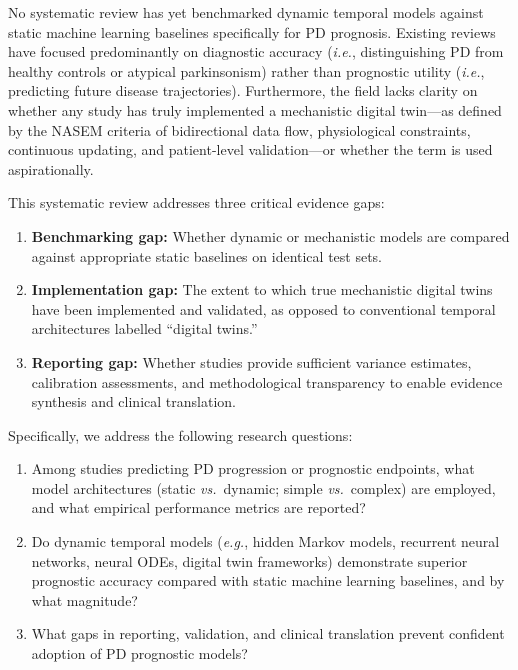 No systematic review has yet benchmarked dynamic temporal models against static machine learning baselines specifically for PD prognosis. Existing reviews have focused predominantly on diagnostic accuracy (\textit{i.e.}, distinguishing PD from healthy controls or atypical parkinsonism) rather than prognostic utility (\textit{i.e.}, predicting future disease trajectories)\cite{asgari2021}. Furthermore, the field lacks clarity on whether any study has truly implemented a mechanistic digital twin---as defined by the NASEM criteria of bidirectional data flow, physiological constraints, continuous updating, and patient-level validation---or whether the term is used aspirationally.

This systematic review addresses three critical evidence gaps:

\begin{enumerate}
    \item \textbf{Benchmarking gap:} Whether dynamic or mechanistic models are compared against appropriate static baselines on identical test sets.
    \item \textbf{Implementation gap:} The extent to which true mechanistic digital twins have been implemented and validated, as opposed to conventional temporal architectures labelled ``digital twins.''
    \item \textbf{Reporting gap:} Whether studies provide sufficient variance estimates, calibration assessments, and methodological transparency to enable evidence synthesis and clinical translation.
\end{enumerate}

\noindent Specifically, we address the following research questions:

\begin{enumerate}
    \item Among studies predicting PD progression or prognostic endpoints, what model architectures (static \textit{vs.}\ dynamic; simple \textit{vs.}\ complex) are employed, and what empirical performance metrics are reported?
    \item Do dynamic temporal models (\textit{e.g.}, hidden Markov models, recurrent neural networks, neural ODEs, digital twin frameworks) demonstrate superior prognostic accuracy compared with static machine learning baselines, and by what magnitude?
    \item What gaps in reporting, validation, and clinical translation prevent confident adoption of PD prognostic models?
\end{enumerate}

